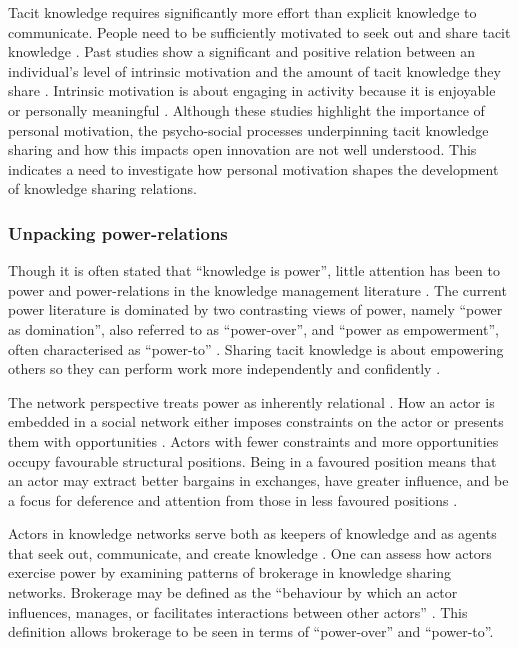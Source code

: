 Tacit knowledge requires significantly more effort than explicit knowledge to communicate. People need to be sufficiently motivated to seek out and share tacit knowledge \citep{leonard1998role}. Past studies show a significant and positive relation between an individual's level of intrinsic motivation and the amount of tacit knowledge they share  \citep[e.g.][]{osterloh2000motivation,kaser2001knowledge,smith2001role}. Intrinsic motivation is about engaging in activity because it is enjoyable or personally meaningful \citep{ryan2000intrinsic}. Although these studies highlight the importance of personal motivation, the psycho-social processes underpinning tacit knowledge sharing and how this impacts open innovation are not well understood. This indicates a need to investigate how personal motivation shapes the development of knowledge sharing relations. \medskip

\subsubsection{Unpacking power-relations}

Though it is often stated that \enquote{knowledge is power}, little attention has been  to power and power-relations in the knowledge management literature \citep{heizmann2015power}. The current power literature is dominated by two contrasting views of power, namely \enquote{power as domination}, also referred to as \enquote{power-over}, and \enquote{power as empowerment}, often characterised as \enquote{power-to} \citep{haugaard2012rethinking}. Sharing tacit knowledge is about empowering others so they can perform work more independently and confidently \citep{bordum2002tacit,lin2007share}. \medskip

The network perspective treats power as inherently relational \citep{ibarra1993network}. How an actor is embedded in a social network either imposes constraints on the actor or presents them with opportunities \citep{burt1992structural,simpson2011network}. Actors with fewer constraints and more opportunities occupy favourable structural positions. Being in a favoured position means that an actor may extract better bargains in exchanges, have greater influence, and be a focus for deference and attention from those in less favoured positions \citep{burt1992structural,hanneman2005introduction,simpson2011network}. \medskip

Actors in knowledge networks serve both as keepers of knowledge and as agents that seek out, communicate, and create knowledge \citep{phelps2012knowledge}. One can assess how actors exercise power by examining patterns of brokerage in knowledge sharing networks. Brokerage may be defined as the \enquote{behaviour by which an actor influences, manages, or facilitates interactions between other actors} \citep{obstfeld2014brokerage}. This definition allows brokerage to be seen in terms of \enquote{power-over} and \enquote{power-to}. \medskip
 

